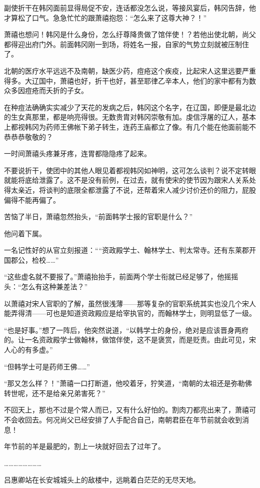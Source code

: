 副使折干在韩冈面前显得局促不安，连话都没怎么说，等接风宴后，韩冈告辞，他才算松了口气。急急忙忙的跟萧禧抱怨：“怎么来了这尊大神？！” 

萧禧也想问！韩冈是什么身份，怎么纡尊降贵做了馆伴使！？若他出使北朝，尚父都得迎出府门外。前面韩冈刚一到场，将姓名一报，自家的气势立刻就被压制住了。 

北朝的医疗水平远远不及南朝，缺医少药，痘疮这个疾疫，比起宋人这里远要严重得多。大辽国中，萧禧也好，折干也好，甚至耶律乙辛本人，他们的家中都有为数众多因痘疮而夭折的子女。 

在种痘法确确实实减少了天花的发病之后，韩冈这个名字，在辽国，即便是最北边的生女真那里，都是响亮得很。无数贵胄对韩冈崇敬有加。虔信浮屠的辽人，基本上都视韩冈为药师王佛帐下弟子转生，连药王庙都立了像。有几个能在他面前能不恭恭恭敬敬的？ 

一时间萧禧头疼兼牙疼，连胃都隐隐疼了起来。

不要说折干，使团中的其他人眼见着都视韩冈如神明，这可怎么谈判？说不定转眼就能将底给泄露了。这不是没有前例，在过去，就有使宋的使节因为跟宋人关系处得太亲近，将谈判的底限全都泄露了不说，还帮着宋人减少讨价还价的阻力，屁股偏得不能再偏了。 

苦恼了半日，萧禧忽然抬头，“前面韩学士报的官职是什么？” 

他问着下属。 

一名记性好的从官立刻报道：““资政殿学士、翰林学士、判太常寺。还有东莱郡开国郡公，检校……” 

“这些虚名就不要报了。”萧禧抬抬手，前面两个学士衔就已经足够了，他摇摇头：“怎么有这种兼差法？” 

以萧禧对宋人官职的了解，虽然很浅薄——那等复杂的官职系统其实也没几个宋人能弄得清——可也是知道资政殿应是给宰执官的，而翰林学士，则明显低了一级。 

“也是好事。”想了一阵后，他突然说道，“以韩学士的身份，绝对是应该晋身两府的。让一名资政殿学士做翰林，做馆伴使，这不是褒赏，而是贬责。由此可见，宋人心的有多虚。” 

“但韩学士可是药师王佛……” 

“那又怎么样？！”萧禧一口打断道，他咬着牙，狞笑道，“南朝的太祖还是弥勒佛转世呢，还不是给亲兄弟害死？” 

不回天上，那也不过是个常人而已，又有什么好怕的。割肉刀都亮出来了，萧禧可不会收回去。何况尚父已经安排了人手配合自己，南朝君臣在年节前就会收到消息！ 

年节前的羊是最肥的，割上一块就好回去了过年了。 

…………………… 

吕惠卿站在长安城城头上的敌楼中，远眺着白茫茫的无尽天地。 

